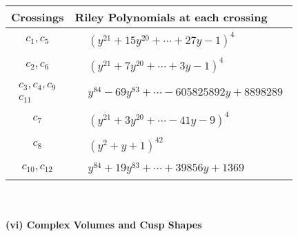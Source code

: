 \documentclass[1p]{elsarticle_modified}
\theoremstyle{definition}
\begin{document}
\begin{tabular}{m{50pt}|m{274pt}}
Crossings & \hspace{64pt}Riley Polynomials at each crossing \\
\hline $$\begin{aligned}c_{1},c_{5}\end{aligned}$$&$\begin{aligned}
&(y^{21}+15 y^{20}+\cdots+27 y-1)^{4}
\end{aligned}$\\
\hline $$\begin{aligned}c_{2},c_{6}\end{aligned}$$&$\begin{aligned}
&(y^{21}+7 y^{20}+\cdots+3 y-1)^{4}
\end{aligned}$\\
\hline $$\begin{aligned}c_{3},c_{4},c_{9}\\c_{11}\end{aligned}$$&$\begin{aligned}
&y^{84}-69 y^{83}+\cdots-605825892 y+8898289
\end{aligned}$\\
\hline $$\begin{aligned}c_{7}\end{aligned}$$&$\begin{aligned}
&(y^{21}+3 y^{20}+\cdots-41 y-9)^{4}
\end{aligned}$\\
\hline $$\begin{aligned}c_{8}\end{aligned}$$&$\begin{aligned}
&(y^2+y+1)^{42}
\end{aligned}$\\
\hline $$\begin{aligned}c_{10},c_{12}\end{aligned}$$&$\begin{aligned}
&y^{84}+19 y^{83}+\cdots+39856 y+1369
\end{aligned}$\\
\hline
\end{tabular}\\~\\
\newpage\flushleft \textbf{(vi) Complex Volumes and Cusp Shapes}
\end{document}
